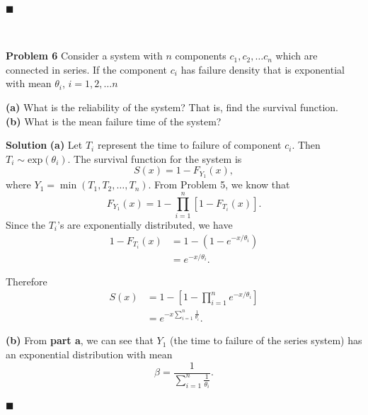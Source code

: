 \documentclass{article}
\newcommand{\mybox}{%
    \collectbox{%
        \setlength{\fboxsep}{1pt}%
        \fbox{\BOXCONTENT}%
    }%
}
\begin{document}
\vspace{-2mm}
\hfill$\blacksquare$

\begin{center}
\vspace{-0.4cm}
\hrulefill \\
\vspace{-0.7cm}
\hrulefill
\end{center}

\vspace{7mm}

\noindent\mybox{\textbf{Problem 6}}  Consider a system with $n$ components $c_1, c_2, \ldots c_n$ which are connected in series.  If the component $c_i$ has failure density that is exponential with mean $\theta_i$, $i=1,2,\ldots n$
\begin{flushleft}
\textbf{(a)}  What is the reliability of the system?  That is, find the survival function. \\
\textbf{(b)}  What is the mean failure time of the system?
\end{flushleft}

\vspace{5mm}

\noindent\mybox{\textbf{Solution}} \textbf{(a)}  Let $T_i$ represent the time to failure of component $c_i$.  Then $T_i \sim \text{exp}(\theta_i)$.  The survival function for the system is $$S(x) = 1 - F_{Y_1}(x),$$ where $Y_1=\min(T_1, T_2, \ldots, T_n)$.  From Problem 5, we know that $$F_{Y_1}(x) = 1-\prod\limits_{i=1}^n[1-F_{T_i}(x)].$$  Since the $T_i$'s are exponentially distributed, we have
\begin{align}
1 - F_{T_i}(x) &= 1 - (1-e^{-x/\theta_i}) \\
&= e^{-x/\theta_i}.
\end{align}

\noindent Therefore
\begin{align}
S(x) &= 1-\left[1-\prod\limits_{i=1}^n e^{-x/\theta_i}\right] \\
&= e^{-x\sum\limits_{i=1}^n\frac{1}{\theta_i}}.
\end{align}

\noindent \textbf{(b)}  From \textbf{part a}, we can see that $Y_1$ (the time to failure of the series system) has an exponential distribution with mean $$\beta = \frac{1}{\sum\limits_{i=1}^n\frac{1}{\theta_i}}.$$

\vspace{-2mm}
\hfill$\blacksquare$

\begin{center}
\vspace{-0.4cm}
\hrulefill \\
\vspace{-0.7cm}
\hrulefill
\end{center}
\end{document}
